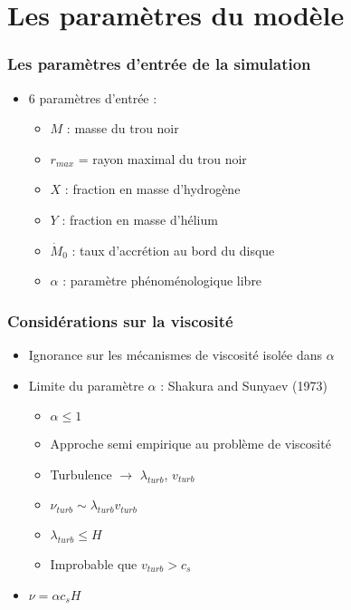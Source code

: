 \section{Les paramètres du modèle}
\begin{frame}
\frametitle{Les paramètres d'entrée de la simulation}
\begin{itemize}
	\item 6 paramètres d'entrée :
	\begin{itemize}
		\item $M$ : masse du trou noir
		\item $r_{max}$ = rayon maximal du trou noir
		\item $X$ : fraction en masse d'hydrogène
		\item $Y$ : fraction en masse d'hélium
		\item $\dot{M}_{0}$ : taux d'accrétion au bord du disque
		\item $\alpha$ : paramètre phénoménologique libre 
	\end{itemize}
\end{itemize}
\end{frame} 

\begin{frame}
\frametitle{Considérations sur la viscosité}
	\begin{itemize}
		\item Ignorance sur les mécanismes de viscosité isolée dans 					$\alpha$ \\
		
		\item Limite du paramètre $\alpha$ : Shakura and Sunyaev (1973)
			\begin{itemize}
				\item $\alpha \le 1$
				\item Approche semi empirique au problème de viscosité
				\item Turbulence $\rightarrow$ $\lambda_{turb}$, 							$v_{turb}$
				\item $\nu_{turb} \sim \lambda_{turb} v_{turb}$
				\item $\lambda_{turb} \le H$
				\item Improbable que $v_{turb} > c_{s}$
			\end{itemize}
		\item $\nu = \alpha c_{s} H$
	\end{itemize}
\end{frame}